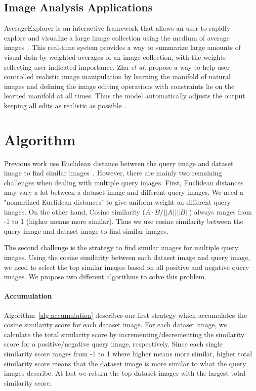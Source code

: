 \subsection{Image Analysis Applications}
AverageExplorer is an interactive framework that allows an user to rapidly
explore and visualize a large image collection using the medium of average
images~\cite{zhu2014averageexplorer}. This real-time system provides a
way to summarize large amounts of visual data by weighted averages of
an image collection, with the weights reflecting user-indicated importance.
Zhu \textit{et al.} propose a way to help user-controlled realistic image
manipulation by learning the manifold of natural images and defining the
image editing operations with constraints lie on the learned manifold at
all times. Thus the model automatically adjusts the output keeping all edits
as realistic as possible~\cite{zhu2016generative}.

\section{Algorithm}
\label{sec:algo}

Previous work use Euclidean distance between the query image and dataset image
to find similar images~\cite{lin2015deep}. However, there are mainly two
remaining challenges when dealing with multiple query images. First, Euclidean
distances may vary a lot between a dataset image and different query images. We
need a "nomarlized Euclidean distances" to give uniform weight on different query
images.  On the other hand, Cosine similarity ($A \cdot B/||A||||B||$) always
ranges from -1 to 1 (higher means more similar). Thus we use cosine similarity
between the query image and dataset image to find similar images.

The second challenge is the strategy to find similar images for multiple query images.
Using the cosine similarity between each dataset image and query image, we need
to select the top similar images based on all positive and negative query images.
We propose two different algorithms to solve this problem.

\paragraph{Accumulation}
Algorithm~\ref{alg:accumulation} describes our first strategy which accumulates the
cosine similarity score for each dataset image. For each dataset image, we calculate
the total similarity score by incrementing/decrementing the similarity score for a
positive/negative query image, respectively. Since each single similarity score ranges
from -1 to 1 where higher means more similar, higher total similarity score means that
the dataset image is more similar to what the query images describe. At last we return
the top dataset images with the largest total similarity score.

